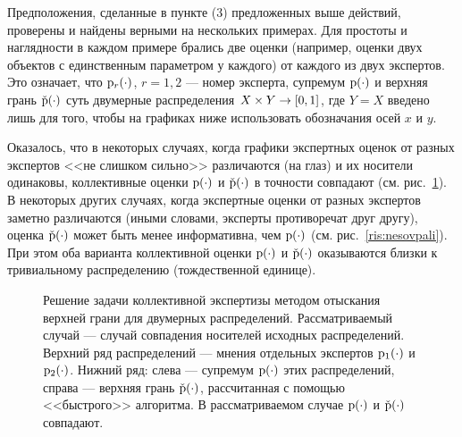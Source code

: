 Предположения, сделанные в пункте (3) предложенных выше действий, проверены и найдены верными на нескольких примерах. Для простоты и наглядности в каждом примере брались две оценки (например, оценки двух объектов с единственным параметром у каждого) от каждого из двух экспертов. Это означает, что ${\mathrm{p}}_r(\cdot)$, $r = 1,2$ --- номер эксперта, супремум ${\mathrm{p}}(\cdot)$ и верхняя грань $\check{{\mathrm{p}}}(\cdot)$ суть двумерные  распределения $X \times Y \rightarrow [0,1]$, где $Y = X$ введено лишь для того, чтобы на графиках ниже использовать обозначания осей $x$ и $y$. 

Оказалось, что в некоторых случаях, когда графики экспертных оценок от разных экспертов <<не слишком сильно>> различаются (на глаз) и их носители одинаковы, коллективные оценки ${\mathrm{p}}(\cdot)$ и $\check{{\mathrm{p}}}(\cdot)$ в точности совпадают (см. рис.~\ref{ris:sovpali}). В некоторых других случаях, когда экспертные оценки от разных экспертов заметно различаются (иными словами, эксперты противоречат друг другу), оценка $\check{{\mathrm{p}}}(\cdot)$ может быть  менее информативна, чем ${\mathrm{p}}(\cdot)$ (см. рис.~\ref{ris:nesovpali}). При этом оба варианта коллективной оценки ${\mathrm{p}}(\cdot)$ и $\check{{\mathrm{p}}}(\cdot)$ оказываются близки к тривиальному распределению (тождественной единице).

\begin{figure}[h]
\caption{\small Решение задачи коллективной экспертизы методом отыскания верхней грани для двумерных распределений. Рассматриваемый случай --- случай совпадения носителей исходных распределений. Верхний ряд распределений --- мнения отдельных экспертов ${\mathrm{p}}_1(\cdot)$ и ${\mathrm{p}}_2(\cdot)$. Нижний ряд: слева --- супремум  ${\mathrm{p}}(\cdot)$ этих распределений, справа --- верхняя грань $\check{{\mathrm{p}}}(\cdot)$, рассчитанная с помощью <<быстрого>> алгоритма. В рассматриваемом случае ${\mathrm{p}}(\cdot)$ и $\check{{\mathrm{p}}}(\cdot)$ совпадают. }
\label{ris:sovpali}
\end{figure}

